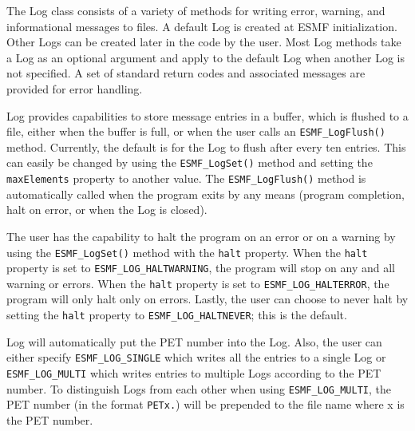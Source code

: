 


\label{sec:Log}

The Log class consists of a variety of methods for writing error, warning, and
informational messages to files.  A default Log is created at ESMF
initialization.  Other Logs can be created later in the code by the user.  Most
Log methods take a Log as an optional argument and apply to the default Log
when another Log is not specified.  A set of standard return codes and
associated messages are provided for error handling.  

Log provides capabilities to store message entries in a buffer, which is 
flushed to a file, either when the buffer is full, or when the user calls an 
{\tt ESMF\_LogFlush()} method.  Currently, the default is for the Log to flush
after every ten entries.  This can easily be changed by using the 
{\tt ESMF\_LogSet()} method and setting the {\tt maxElements} property to 
another value.  The {\tt ESMF\_LogFlush()} method is automatically called when 
the program exits by any means (program completion, halt on error, or when the
Log is closed).

The user has the capability to halt the program on an error or on a warning by
using the {\tt ESMF\_LogSet()} method with the {\tt halt} property.  When the 
{\tt halt} property is set to {\tt ESMF\_LOG\_HALTWARNING}, the program will 
stop on any and all warning or errors.  When the {\tt halt} property is set to 
{\tt ESMF\_LOG\_HALTERROR}, the program will only halt only on errors.  Lastly,
the user can choose to never halt by setting the {\tt halt} property to 
{\tt ESMF\_LOG\_HALTNEVER}; this is the default.

Log will automatically put the PET number into the Log.  Also, the user can 
either specify {\tt ESMF\_LOG\_SINGLE} which writes all the entries to a single 
Log or {\tt ESMF\_LOG\_MULTI} which writes entries to multiple Logs according to 
the PET number.  To distinguish Logs from each other when using 
{\tt ESMF\_LOG\_MULTI}, the PET number (in the format {\tt PETx.}) will be 
prepended to the file name where x is the PET number.

